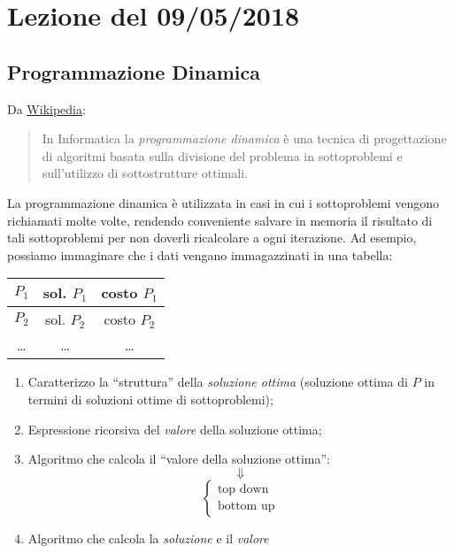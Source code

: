 \section{Lezione del 09/05/2018}

\subsection{Programmazione Dinamica}

Da \href{https://it.wikipedia.org/wiki/Programmazione_dinamica}{Wikipedia}: 
\begin{quote}
    In Informatica la \emph{programmazione dinamica} è una tecnica di progettazione di algoritmi basata sulla divisione del problema in 
    sottoproblemi e sull'utilizzo di sottostrutture ottimali. 
\end{quote}

La programmazione dinamica è utilizzata in casi in cui i sottoproblemi vengono richiamati molte volte, rendendo
conveniente salvare in memoria il risultato di tali sottoproblemi per non doverli ricalcolare a ogni iterazione. Ad esempio, possiamo immaginare che i dati vengano
immagazzinati in una tabella:

\begin{center}
    \begin{tabular}{|c|c|c|}
        \hline
        $P_1$ & sol. $P_1$ & costo $P_1$ \\
        \hline 
        $P_2$ & sol. $P_2$ & costo $P_2$ \\
        \hline
        \dots & \dots & \dots \\
        \hline
    \end{tabular}    
\end{center}

\begin{enumerate}
    \item Caratterizzo la ``struttura'' della \emph{soluzione ottima} (soluzione ottima di $P$ in termini di soluzioni ottime di sottoproblemi);
    \item Espressione ricorsiva del \emph{valore} della soluzione ottima;
    \item Algoritmo che calcola il ``valore della soluzione ottima'':
    $$\Downarrow$$
    \[
        \begin{cases}
            \text{top down} \\
            \text{bottom up}
        \end{cases}
    \]
    \item Algoritmo che calcola la \emph{soluzione} e il \emph{valore}
\end{enumerate}

